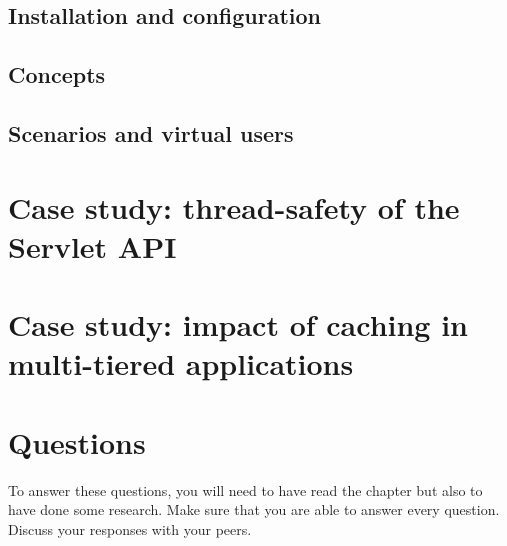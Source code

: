 \subsection{Installation and configuration}
\subsection{Concepts}
\subsection{Scenarios and virtual users}

\section{Case study: thread-safety of the Servlet API}

\section{Case study: impact of caching in multi-tiered applications}

\section{Questions}

To answer these questions, you will need to have read the chapter but also to have done some research. Make sure that you are able to answer every question. Discuss your responses with your peers.


